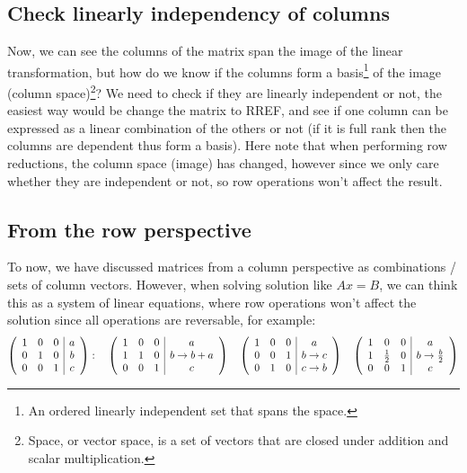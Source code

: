 \documentclass[11pt, cyan, night, 1in]{LatexTemplate/hw}
\begin{document}
\subsection{Check linearly independency of columns}

Now, we can see the columns of the matrix span the image of the linear transformation, but how do we know if the columns form a basis\footnote{An ordered linearly independent set that spans the space.} of the image (column space)\footnote{Space, or vector space, is a set of vectors that are closed under addition and scalar multiplication.}? We need to check if they are linearly independent or not, the easiest way would be change the matrix to RREF, and see if one column can be expressed as a linear combination of the others or not (if it is full rank then the columns are dependent thus form a basis). Here note that when performing row reductions, the column space (image) has changed, however since we only care whether they are independent or not, so row operations won't affect the result. 

\subsection{From the row perspective}

To now, we have discussed matrices from a column perspective as combinations / sets of column vectors. However, when solving solution like $Ax=B$, we can think this as a system of linear equations, where row operations won't affect the solution since all operations are reversable, for example: \[
    \left(\begin{array}{ccc|c}
        1 & 0 & 0  & a\\
        0 & 1 & 0  & b\\
        0 & 0 & 1 & c
    \end{array}\right):\quad\left(\begin{array}{ccc|c}
        1 & 0 & 0  & a\\
        1 & 1 & 0  & b \rightarrow b + a\\
        0 & 0 & 1 & c
    \end{array}\right) \quad \left(\begin{array}{ccc|c}
        1 & 0 & 0  & a\\
        0 & 0 & 1  & b \rightarrow c\\
        0 & 1 & 0 & c \rightarrow b
    \end{array}\right) \quad \left(\begin{array}{ccc|c}
        1 & 0 & 0  & a\\
        1 & \frac12 & 0  & b \rightarrow \frac{b}{2}\\
        0 & 0 & 1 & c
    \end{array}\right) 
    \]
\end{document}
